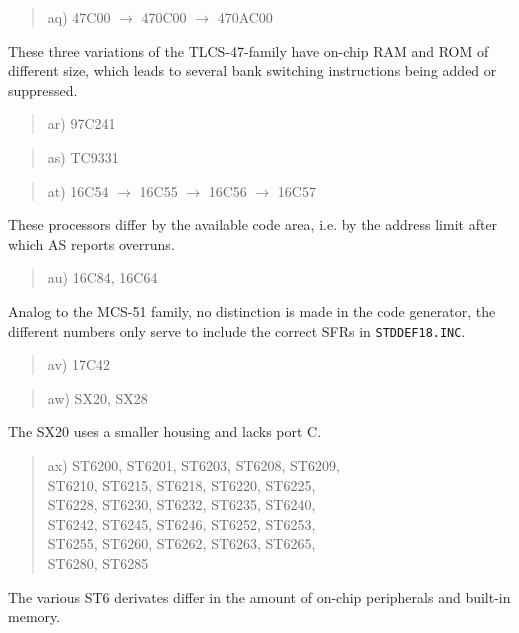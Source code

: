 \documentclass[12pt,twoside]{report}
\newcommand{\tty}[1]{{\tt #1}}
\begin{document}
\begin{quote}
aq) 47C00 $\rightarrow$ 470C00 $\rightarrow$ 470AC00
\end{quote}
These three variations of the TLCS-47-family have on-chip RAM and ROM
of different size, which leads to several bank switching instructions
being added or suppressed.
\begin{quote}
ar) 97C241
\end{quote}
\begin{quote}
as) TC9331
\end{quote}
\begin{quote}
at) 16C54 $\rightarrow$ 16C55 $\rightarrow$ 16C56 $\rightarrow$ 16C57
\end{quote}
These processors differ by the available code area, i.e. by the address
limit after which AS reports overruns.
\begin{quote}
au) 16C84, 16C64
\end{quote}
Analog to the MCS-51 family, no distinction is made in the code generator,
the different numbers only serve to include the correct SFRs in
\tty{STDDEF18.INC}.
\begin{quote}
av) 17C42
\end{quote}
\begin{quote}
aw) SX20, SX28
\end{quote}
The SX20 uses a smaller housing and lacks port C.
\begin{quote}
ax) ST6200, ST6201, ST6203, ST6208, ST6209,\\
    ST6210, ST6215, ST6218, ST6220, ST6225,\\
    ST6228, ST6230, ST6232, ST6235, ST6240,\\
    ST6242, ST6245, ST6246, ST6252, ST6253,\\
    ST6255, ST6260, ST6262, ST6263, ST6265,\\
    ST6280, ST6285
\end{quote}
The various ST6 derivates differ in the amount of
on-chip peripherals and built-in memory.
\end{document}
